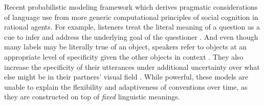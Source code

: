 \documentclass[11pt]{article}
\begin{document}
Recent probabilistic modeling framework which derives pragmatic considerations of language use from more generic computational principles of social cognition in rational agents.
For example, listeners treat the literal meaning of a question as a cue to infer and address the underlying goal of the questioner \cite{hawkins_why_2015, hawkins_QA_2018}.
And even though many labels may be literally true of an object, speakers refer to objects at an appropriate level of specificity given the other objects in context \cite{graf_animal_2016, monroe2017colors}.
They also increase the specificity of their utterances under additional uncertainty over what else might be in their partners' visual field \cite{hawkins_conversational_2016, hawkins2018speakers}.
While powerful, these models are unable to explain the flexibility and adaptiveness of conventions over time, as they are constructed on top of \emph{fixed} linguistic meanings.



\end{document}
